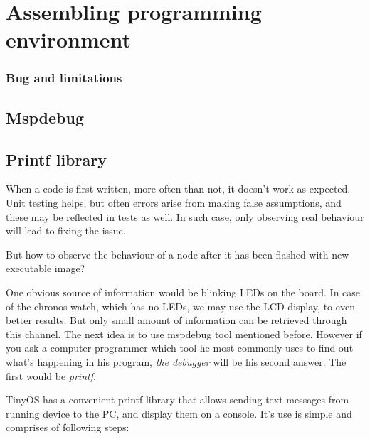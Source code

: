 \chapter{Assembling programming environment}


\subsection{Bug and limitations}


\section{Mspdebug}

\section{Printf library}

When a code is first written, more often than not, it doesn't work as
expected. Unit testing helps, but often errors arise from making false
assumptions, and these may be reflected in tests as well. In such
case, only observing real behaviour will lead to fixing the issue.

But how to observe the behaviour of a node after it has been flashed
with new executable image?

One obvious source of information would be blinking LEDs on the board.
In case of the chronos watch, which has no LEDs, we may use the LCD
display, to even better results. But only small amount of information
can be retrieved through this channel. The next idea is to use
mspdebug tool mentioned before.  However if you ask a computer
programmer which tool he most commonly uses to find out what's
happening in his program, \emph{the debugger} will be his second
answer. The first would be \emph{printf}.

TinyOS has a convenient printf library that allows sending text
messages from running device to the PC, and display them on a console.
It's use is simple and comprises of following steps:

